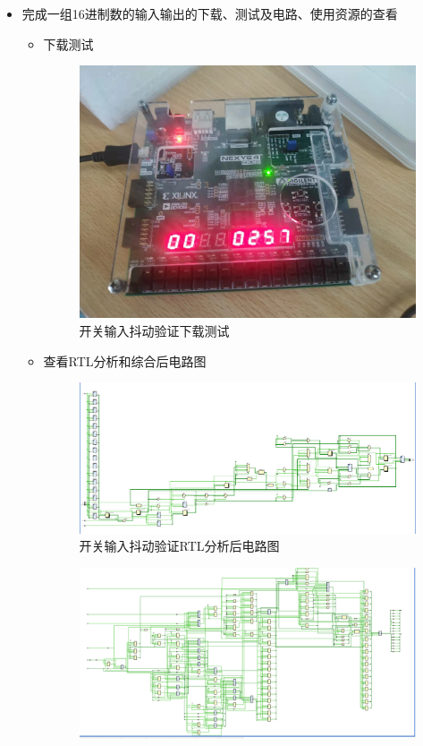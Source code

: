 \documentclass[UTF8,fontset=fandol]{ctexart}
\begin{document}
\begin{itemize}
\item 完成一组16进制数的输入输出的下载、测试及电路、使用资源的查看
\begin{itemize}
  \item 下载测试
  \begin{figure}[H]
    \centering
    \includegraphics[scale=0.2]{微信图片_20211125135349.jpg}
    \caption{开关输入抖动验证下载测试}
\end{figure}
\item 查看RTL分析和综合后电路图
\begin{figure}[H]
  \centering
  \includegraphics[scale=0.5]{Snipaste_2021-11-25_13-52-33.png}
  \caption{开关输入抖动验证RTL分析后电路图}
\end{figure}
\begin{figure}[H]
  \centering
  \includegraphics[scale=0.6]{Snipaste_2021-11-25_13-52-57.png}

\end{figure}
\end{itemize}
\end{itemize}
\end{document}
